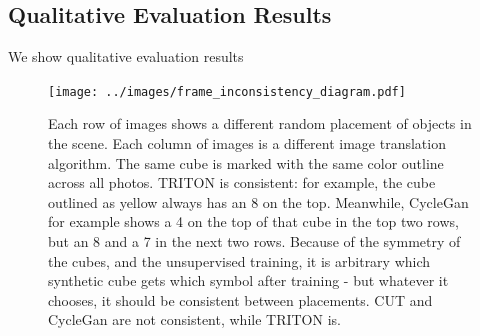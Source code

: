 \documentclass{article}
\begin{document}


\subsection{Qualitative Evaluation Results}
We show qualitative evaluation results 
\begin{figure}[thbp]
    \vspace{-30pt}
	\begin{center}
		\texttt{[image: ../images/frame\_inconsistency\_diagram.pdf]}
	\end{center}
	\caption{
		Each row of images shows a different random placement of objects in the scene.
		Each column of images is a different image translation algorithm.
		The same cube is marked with the same color outline across all photos.
		TRITON is consistent: for example, the cube outlined as yellow always has an 8 on the top.
		Meanwhile, CycleGan for example shows a 4 on the top of that cube in the top two rows, but an 8 and a 7 in the next two rows.
		Because of the symmetry of the cubes, and the unsupervised training, it is arbitrary which synthetic cube gets which symbol after training - but whatever it chooses, it should be consistent between placements.
		CUT and CycleGan are not consistent, while TRITON is.
		}
		\label{fig:frame_inconsistency_diagram}
	\end{figure}
	
\end{document}
